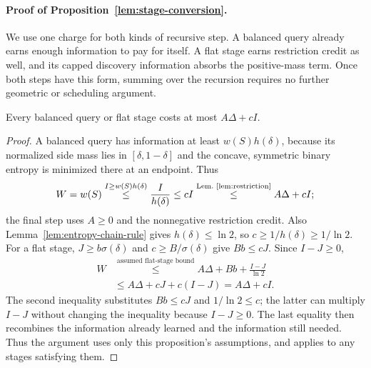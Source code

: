 \paragraph{Proof of Proposition~\ref{lem:stage-conversion}.}
We use one charge for both kinds of recursive step. A balanced
query already earns enough information to pay for itself. A flat
stage earns restriction credit as well, and its capped discovery
information absorbs the positive-mass term. Once both steps have
this form, summing over the recursion requires no further
geometric or scheduling argument.

\begin{claim}
\label{clm:stage-paid}
Every balanced query or flat stage costs at most $A\Delta+cI$.
\end{claim}
\begin{proof}
A balanced query has information at least $w(S)h(\delta)$,
because its normalized side mass lies in $[\delta,1-\delta]$ and
the concave, symmetric binary entropy is minimized there at an
endpoint. Thus
\[
 W=w(S)\overset{I\ge w(S)h(\delta)}{\le}\frac{I}{h(\delta)}
 \le cI\byref{Lem.}{lem:restriction}{\le} A\Delta+cI;
\]
the final step uses $A\ge0$ and the nonnegative restriction credit.
Also Lemma~\ref{lem:entropy-chain-rule} gives $h(\delta)\le\ln2$,
so $c\ge1/h(\delta)\ge1/\ln2$.
For a flat stage, $J\ge b\sigma(\delta)$ and
$c\ge B/\sigma(\delta)$ give $Bb\le cJ$. Since $I-J\ge0$,
\[
 \begin{aligned}
 W&\overset{\text{assumed flat-stage bound}}{\le} A\Delta+Bb+\frac{I-J}{\ln2}\\
  &\le A\Delta+cJ+c(I-J)=A\Delta+cI.
 \end{aligned}
\]
The second inequality substitutes $Bb\le cJ$ and
$1/\ln2\le c$; the latter can multiply $I-J$ without changing
the inequality because $I-J\ge0$. The last equality then
recombines the information already learned and the information
still needed. Thus the argument uses only this proposition's
assumptions, and applies to any stages satisfying them.
\end{proof}

